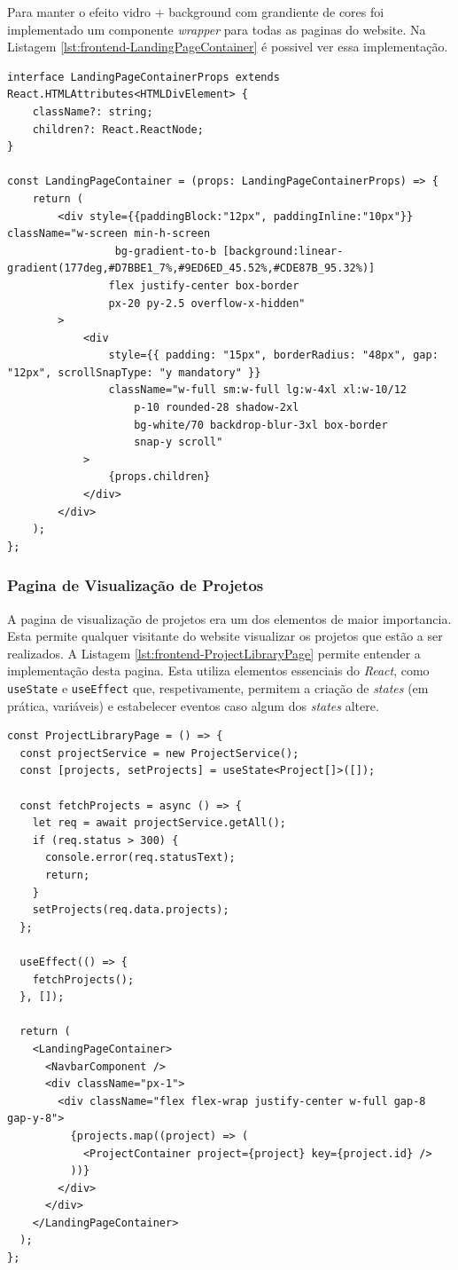 Para manter o efeito vidro + background com grandiente de cores foi implementado um componente \textit{wrapper} para todas as paginas do website. Na Listagem \ref{lst:frontend-LandingPageContainer} é possivel ver essa implementação.

\begin{lstlisting}[caption={Função LandingPageContainer}, label={lst:frontend-LandingPageContainer}]
interface LandingPageContainerProps extends React.HTMLAttributes<HTMLDivElement> {
	className?: string;
    children?: React.ReactNode;
}

const LandingPageContainer = (props: LandingPageContainerProps) => {
    return (
        <div style={{paddingBlock:"12px", paddingInline:"10px"}} className="w-screen min-h-screen
            	 bg-gradient-to-b [background:linear-gradient(177deg,#D7BBE1_7%,#9ED6ED_45.52%,#CDE87B_95.32%)]
            	flex justify-center box-border
				px-20 py-2.5 overflow-x-hidden"
		>
			<div
				style={{ padding: "15px", borderRadius: "48px", gap: "12px", scrollSnapType: "y mandatory" }}
				className="w-full sm:w-full lg:w-4xl xl:w-10/12
            		p-10 rounded-28 shadow-2xl
            		bg-white/70 backdrop-blur-3xl box-border
					snap-y scroll"
			>
				{props.children}
			</div>
		</div>
    );
};
\end{lstlisting}

\subsubsection{Pagina de Visualização de Projetos}

A pagina de visualização de projetos era um dos elementos de maior importancia. Esta permite qualquer visitante do website visualizar os projetos que estão a ser realizados. A Listagem \ref{lst:frontend-ProjectLibraryPage} permite entender a implementação desta pagina. Esta utiliza elementos essenciais do \textit{React}, como \lstinline|useState| e \lstinline|useEffect| que, respetivamente, permitem a criação de \textit{states} (em prática, variáveis) e estabelecer eventos caso algum dos \textit{states} altere.  

\begin{lstlisting}[caption={Função ProjectLibraryPage}, label={lst:frontend-ProjectLibraryPage}]
const ProjectLibraryPage = () => {
  const projectService = new ProjectService();
  const [projects, setProjects] = useState<Project[]>([]);

  const fetchProjects = async () => {
    let req = await projectService.getAll();
    if (req.status > 300) {
      console.error(req.statusText);
      return;
    }
    setProjects(req.data.projects);
  };

  useEffect(() => {
    fetchProjects();
  }, []);

  return (
    <LandingPageContainer>
      <NavbarComponent />
      <div className="px-1">
        <div className="flex flex-wrap justify-center w-full gap-8 gap-y-8">
          {projects.map((project) => (
            <ProjectContainer project={project} key={project.id} />
          ))}
        </div>
      </div>
    </LandingPageContainer>
  );
};
\end{lstlisting}

